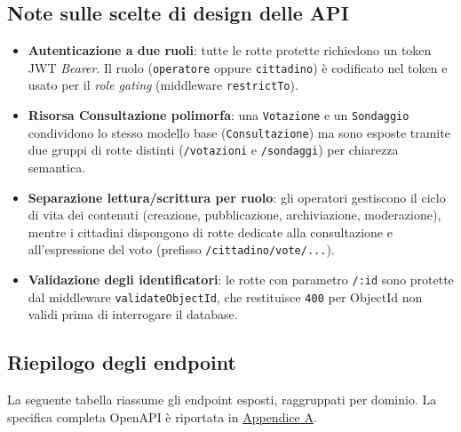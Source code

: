 \documentclass{article}
\newcommand{\code}[1]{\texttt{\small #1}}
\begin{document}
\subsection*{Note sulle scelte di design delle API}
\begin{itemize}
	\item \textbf{Autenticazione a due ruoli}: tutte le rotte protette richiedono un token
	JWT \textit{Bearer}. Il ruolo (\code{operatore} oppure \code{cittadino}) è codificato nel
	token e usato per il \textit{role gating} (middleware \code{restrictTo}).
	\item \textbf{Risorsa Consultazione polimorfa}: una \code{Votazione} e un \code{Sondaggio}
	condividono lo stesso modello base (\code{Consultazione}) ma sono esposte tramite due
	gruppi di rotte distinti (\code{/votazioni} e \code{/sondaggi}) per chiarezza semantica.
	\item \textbf{Separazione lettura/scrittura per ruolo}: gli operatori gestiscono il ciclo
	di vita dei contenuti (creazione, pubblicazione, archiviazione, moderazione), mentre i
	cittadini dispongono di rotte dedicate alla consultazione e all'espressione del voto
	(prefisso \code{/cittadino/vote/...}).
	\item \textbf{Validazione degli identificatori}: le rotte con parametro \code{/:id} sono
	protette dal middleware \code{validateObjectId}, che restituisce \code{400} per ObjectId
	non validi prima di interrogare il database.
\end{itemize}

\subsection*{Riepilogo degli endpoint}
La seguente tabella riassume gli endpoint esposti, raggruppati per dominio. La specifica
completa OpenAPI è riportata in \hyperref[app:openapi]{Appendice A}.
\end{document}
